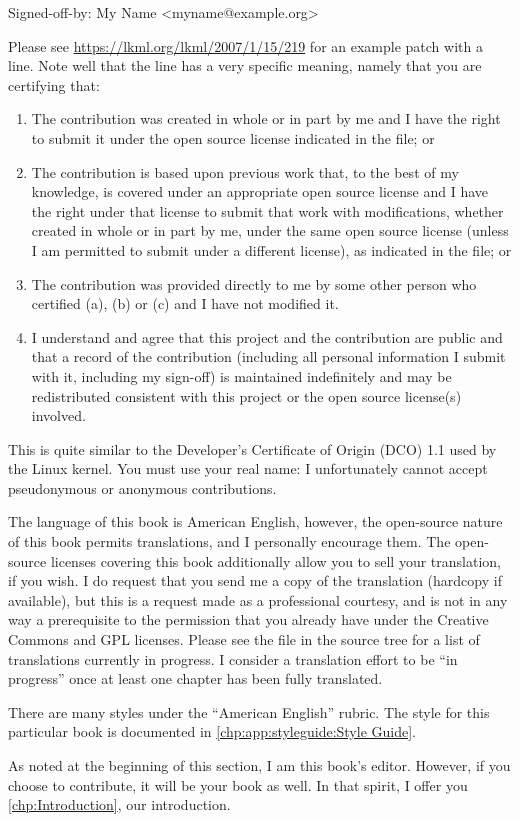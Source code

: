 \begin{VerbatimU}
Signed-off-by: My Name <myname@example.org>
\end{VerbatimU}

Please see \url{https://lkml.org/lkml/2007/1/15/219} for an example
patch with a  line.
Note well that the  line has a very specific meaning,
namely that you are certifying that:

\begin{enumerate}[label={(\alph*)}]
\item	The contribution was created in whole or in part
	by me and I have the right to submit it under
	the open source license indicated in the file; or
\item	The contribution is based upon previous work
	that, to the best of my knowledge, is covered
	under an appropriate open source license and I
	have the right under that license to submit that
	work with modifications, whether created in whole
	or in part by me, under the same open source
	license (unless I am permitted to submit under
	a different license), as indicated in the file; or
\item	The contribution was provided directly to me by
	some other person who certified (a), (b) or (c)
	and I have not modified it.
\item	I understand and agree that this project and the
	contribution are public and that a record of the
	contribution (including all personal information
	I submit with it, including my sign-off) is
	maintained indefinitely and may be redistributed
	consistent with this project or the open source
	license(s) involved.
\end{enumerate}

This is quite similar to the Developer's Certificate of Origin (DCO)
1.1 used by the Linux kernel.
You must use your real name:  I unfortunately cannot accept pseudonymous or
anonymous contributions.

The language of this book is American English, however, the open-source
nature of this book permits translations, and I personally encourage them.
The open-source licenses covering this book additionally allow you
to sell your translation, if you wish.
I do request that you send me a copy of the translation (hardcopy if
available), but this is a request made as a professional courtesy,
and is not in any way a prerequisite to the permission that you already
have under the Creative Commons and GPL licenses.
Please see the  file in the source tree for a list of
translations currently in progress.
I consider a translation effort to be ``in progress'' once at least one
chapter has been fully translated.

There are many styles under the ``American English'' rubric.
The style for this particular book is documented in
\cref{chp:app:styleguide:Style Guide}.

As noted at the beginning of this section, I am this book's editor.
However, if you choose to contribute, it will be your book as well.
In that spirit, I offer you \cref{chp:Introduction}, our introduction.

